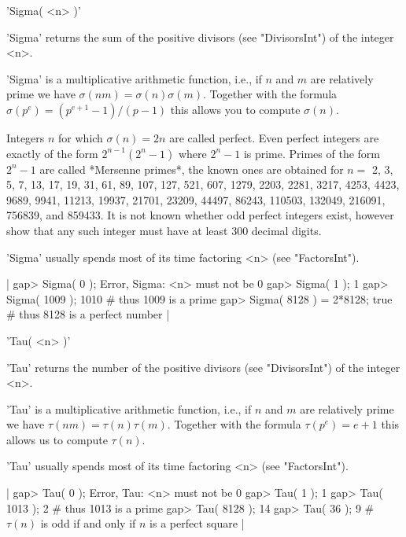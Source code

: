 %
%

'Sigma( <n> )'

'Sigma' returns  the sum of the  positive divisors (see "DivisorsInt") of
the integer <n>.

'Sigma' is a multiplicative arithmetic function, i.e., if $n$ and $m$ are
relatively  prime we have $\sigma(n m) = \sigma(n)  \sigma(m)$.  Together
with  the  formula $\sigma(p^e) = (p^{e+1}-1) / (p-1)$ this allows you to
compute $\sigma(n)$.

Integers  $n$ for which $\sigma(n)=2 n$ are called perfect.  Even perfect
integers are exactly of the form $2^{n-1}(2^n-1)$ where $2^n-1$ is prime.
Primes of the form  $2^n-1$ are called *Mersenne  primes*, the known ones
are obtained for $n =$ 2, 3, 5, 7, 13, 17, 19, 31, 61, 89, 107, 127, 521,
607, 1279, 2203, 2281, 3217, 4253, 4423, 9689, 9941, 11213, 19937, 21701,
23209,  44497, 86243, 110503, 132049,  216091, 756839, and 859433.  It is
not known whether odd  perfect integers  exist, however \cite{BC89}  show
that any such integer must have at least 300 decimal digits.

'Sigma' usually spends most of its time factoring <n> (see "FactorsInt").

|    gap> Sigma( 0 );
    Error, Sigma: <n> must not be 0
    gap> Sigma( 1 );
    1
    gap> Sigma( 1009 );
    1010        # thus 1009 is a prime
    gap> Sigma( 8128 ) = 2*8128;
    true        # thus 8128 is a perfect number |

%

'Tau( <n> )'

'Tau' returns the number of  the positive divisors (see "DivisorsInt") of
the integer <n>.

'Tau' is a multiplicative  arithmetic function,  i.e., if $n$ and $m$ are
relatively  prime we have $\tau(n  m) =  \tau(n) \tau(m)$.  Together with
the formula $\tau(p^e) = e+1$ this allows us to compute $\tau(n)$.

'Tau' usually spends most of its time factoring <n> (see "FactorsInt").

|    gap> Tau( 0 );
    Error, Tau: <n> must not be 0
    gap> Tau( 1 );
    1
    gap> Tau( 1013 );
    2        # thus 1013 is a prime
    gap> Tau( 8128 );
    14
    gap> Tau( 36 );
    9        # $\tau(n)$ is odd if and only if $n$ is a perfect square |

